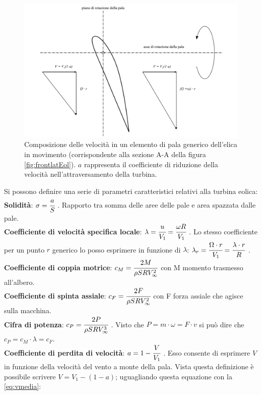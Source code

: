 \begin{figure}
\centering
  \includegraphics[width=\textwidth]{fig/triangEol.pdf}
\caption{Composizione delle velocità in un elemento di pala generico dell'elica in movimento (corrispondente alla sezione A-A della figura \ref{fig:frontlatEol}). $a$ rappresenta il coefficiente di riduzione della velocità nell'attraversamento della turbina.}
\label{fig:triangEol}
\end{figure}
Si possono definire una serie di parametri caratteristici relativi alla turbina eolica:\\
\textbf{Solidità}: $\sigma=\cfrac{a}{S}$ . Rapporto tra somma delle aree delle pale e area spazzata dalle pale.\\
\textbf{Coefficiente di velocità specifica locale}:
$\lambda=\cfrac{u}{V_1}=\cfrac{\omega R}{V_1}$ . Lo stesso coefficiente per un punto $r$ generico lo posso esprimere in funzione di $\lambda$: $\lambda_r = \cfrac{\Omega \cdot r}{V_1} = \cfrac{\lambda \cdot r}{R}$ .\\
\textbf{Coefficiente di coppia motrice}: $c_M=\cfrac{2M}{\rho S R V_\infty^2}$ con M momento trasmesso all'albero.\\
\textbf{Coefficiente di spinta assiale}: $c_F=\cfrac{2F}{\rho S R V_\infty^2}$ con F forza assiale che agisce sulla macchina.\\
\textbf{Cifra di potenza}: $c_P=\cfrac{2P}{\rho S R V_\infty^3}$ . Visto che $P=m\cdot \omega = F \cdot v$ si può dire che $c_P=c_M \cdot \lambda=c_F$.\\
\textbf{Coefficiente di perdita di velocità}: $a=1-\cfrac{V}{V_1}$ . Esso consente di esprimere $V$ in funzione della velocità del vento a monte della pala. Vista questa definizione è possibile scrivere $V=V_1-(1-a)$; uguagliando questa equazione con la \ref{eq:vmedia}:
